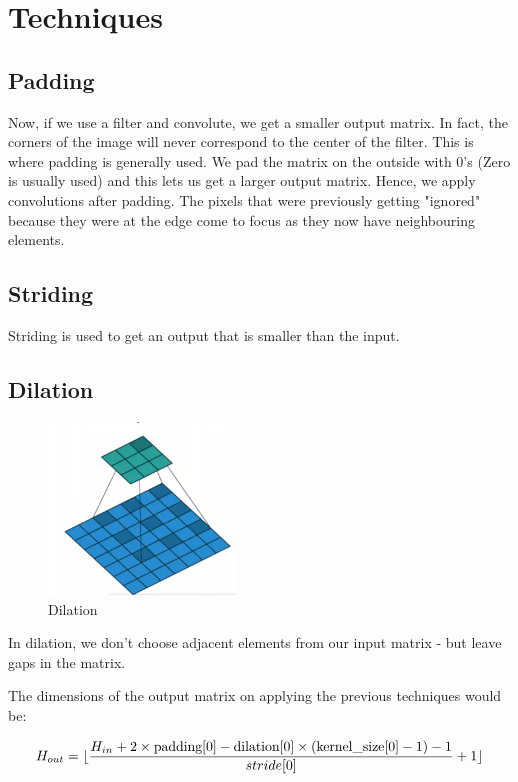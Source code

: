\section{Techniques}

\subsection{Padding}

Now, if we use a filter and convolute, we get a smaller output matrix. In fact, the corners of the image will never correspond to the center of the filter. This is where padding is generally used. We pad the matrix on the outside with 0's (Zero is usually used) and this lets us get a larger output matrix. Hence, we apply convolutions after padding. The pixels that were previously getting "ignored" because they were at the edge come to focus as they now have neighbouring elements.

\subsection{Striding}

Striding is used to get an output that is smaller than the input.

\subsection{Dilation}

\begin{figure}[hbtp]
    \centering
    \includegraphics[width=5cm]{img/dilation-cnn.png}
    \caption{Dilation}
    \label{fig:dilation}
\end{figure}

In dilation, we don't choose adjacent elements from our input matrix - but leave gaps in the matrix.

The dimensions of the output matrix on applying the previous techniques would be:

\begin{align}
    H_{out} = \lfloor\frac{H_{in} + 2\times \text{padding}[0] - \text{dilation}[0]\times (\text{kernel\_size}[0] - 1) - 1}{stride[0]} + 1\rfloor
\end{align}

